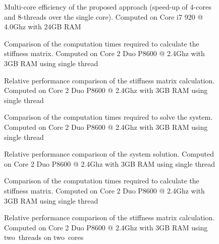 \begin{figure}[h]
\centerline{}
\caption{Multi-core efficiency of the proposed approach (speed-up of 4-cores and 8-threads over the single core). Computed on Core i7 920 @ 4.0Ghz with 24GB RAM}
\label{fig:mcEfficiencyi7}
\end{figure}

\begin{figure}[h]
\centerline{}
\caption{Comparison of the computation times required to calculate the stiffness matrix. Computed on Core 2 Duo P8600 @ 2.4Ghz with 3GB RAM using single thread}
\label{fig:singleStiffc2CT}
\end{figure}

\begin{figure}[h]
\centerline{}
\caption{Relative performance comparison of the stiffness matrix calculation. Computed on Core 2 Duo P8600 @ 2.4Ghz with 3GB RAM using single thread}
\label{fig:singleStiffc2}
\end{figure}

\clearpage
\begin{figure}[t]
\centerline{}
\caption{Comparison of the computation times required to solve the system. Computed on Core 2 Duo P8600 @ 2.4Ghz with 3GB RAM using single thread}
\label{fig:singleSystemc2CT}
\end{figure}

\begin{figure}[b]
\centerline{}
\caption{Relative performance comparison of the system solution. Computed on Core 2 Duo P8600 @ 2.4Ghz with 3GB RAM using single thread}
\label{fig:singleSystemc2}
\end{figure}

\begin{figure}[h]
\centerline{}
\caption{Comparison of the computation times required to calculate the stiffness matrix. Computed on Core 2 Duo P8600 @ 2.4Ghz with 3GB RAM using single thread}
\label{fig:multiStiffc2CT}
\end{figure}

\begin{figure}[h]
\centerline{}
\caption{Relative performance comparison of the stiffness matrix calculation. Computed on Core 2 Duo P8600 @ 2.4Ghz with 3GB RAM using two~threads on two~cores}
\label{fig:multiStiffc2}
\end{figure}

